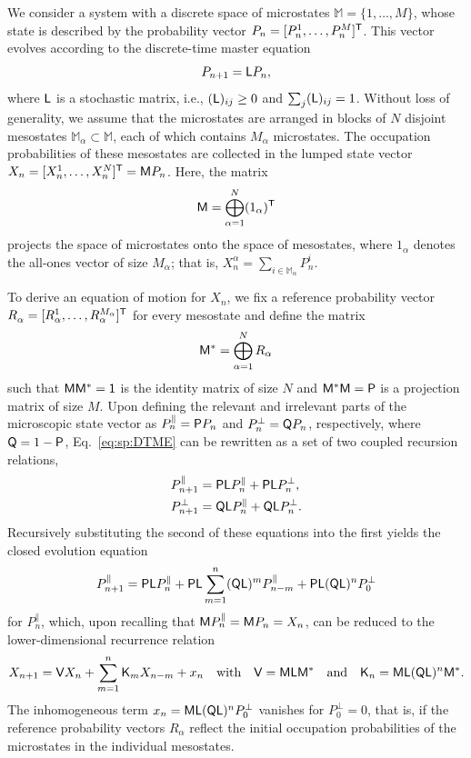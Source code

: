 \documentclass[aps,prl,reprint]{revtex4-2}
\begin{document}
We consider a system with a discrete space of microstates $\mathbb{M}=\{1,\dots,M\}$, whose state is described by the probability vector $P_n =[P^1_n,\dots, P^M_n]^{\mathsf{T}}$.
This vector evolves according to the discrete-time master equation
\begin{equation}
\label{eq:markov_jump}
P_{n+1} = \mathsf{L} P_{n},
\end{equation}
where $\mathsf{L}$ is a stochastic matrix, i.e., $(\mathsf{L})_{ij}\geq 0$ and $\sum_j (\mathsf{L})_{ij} =1$.
Without loss of generality, we assume that the microstates are arranged in blocks of $N$ disjoint mesostates $\mathbb{M}_\alpha\subset\mathbb{M}$, each of which contains $M_\alpha$ microstates.
The occupation probabilities of these mesostates are collected in the lumped state vector $X_n = [X^1_n,\dots,X^N_n]^{\mathsf{T}} = \mathsf{M} P_n$.
Here, the matrix
\begin{equation}\label{eq:sp:DTME}
\mathsf{M} = \bigoplus_{\alpha=1}^N (1_\alpha)^{\mathsf{T}}
\end{equation}
projects the space of microstates onto the space of mesostates, where $1_{\alpha}$ denotes the all-ones vector of size $M_\alpha$;
that is, $X^\alpha_n = \sum_{i\in\mathbb{M}_\alpha}P^i_n$.

To derive an equation of motion for $X_n$, we fix a reference probability vector $R_\alpha^{\vphantom{M_\alpha}}=[R^{1\vphantom{M_\alpha}}_\alpha,\dots,R^{M_\alpha}_\alpha]^{\mathsf{T}}$ for every mesostate and define the matrix
\begin{equation}
\mathsf{M}^\ast = \bigoplus_{\alpha=1}^N R_\alpha
\end{equation}
such that $\mathsf{M}\mathsf{M}^\ast=\mathsf{1}$ is the identity matrix of size $N$ and $\mathsf{M}^\ast\mathsf{M}=\mathsf{P}$ is a projection matrix of size $M$.
Upon defining the relevant and irrelevant parts of the microscopic state vector as $P_n^\parallel = \mathsf{P} P_n$ and $P_n^\perp = \mathsf{Q} P_n$, respectively, where $\mathsf{Q} = 1-\mathsf{P}$, Eq.~\eqref{eq:sp:DTME} can be rewritten as a set of two coupled recursion relations,
\begin{align}
\label{eq:sp:xnpar}
P_{n+1}^\parallel & = \mathsf{P}\mathsf{L} P_n^{\parallel} + \mathsf{P}\mathsf{L} P_n^\perp, \\
\label{eq:sp:xnperp}
P_{n+1}^\perp & = \mathsf{Q}\mathsf{L} P_n^{\parallel} + \mathsf{Q}\mathsf{L} P_n^\perp.
\end{align}
Recursively substituting the second of these equations into the first yields the closed evolution equation
\begin{equation}
\label{eq:xnpar_2}
P_{n+1}^\parallel = \mathsf{P}\mathsf{L} P_n^{\parallel} + \mathsf{P}\mathsf{L} \sum_{m=1}^{n} (\mathsf{Q}\mathsf{L})^{m} P_{n-m}^\parallel + \mathsf{P}\mathsf{L} (\mathsf{Q}\mathsf{L})^n P^\perp_0
\end{equation}
for $P^\parallel_n$, which, upon recalling that $\mathsf{M} P^\parallel_n = \mathsf{M} P_n = X_n$, can be reduced to the lower-dimensional recurrence relation
\begin{equation}\label{eq:sp:NLEEQ}
X_{n+1} = \mathsf{V} X_n +  \sum_{m=1}^{n} \mathsf{K}_m X_{n-m} + x_n
\quad\text{with}\quad
\mathsf{V} = \mathsf{M}\mathsf{L}\mathsf{M}^* \quad\text{and}\quad
\mathsf{K}_{n} = \mathsf{M}\mathsf{L}(\mathsf{Q}\mathsf{L})^{n}\mathsf{M}^*.
\end{equation}
The inhomogeneous term $x_n = \mathsf{M}\mathsf{L}(\mathsf{Q}\mathsf{L})^n P^\perp_0$ vanishes for $P^\perp_0 =0$, that is, if the reference probability vectors $R_\alpha$ reflect the initial occupation probabilities of the microstates in the individual mesostates.
\end{document}
